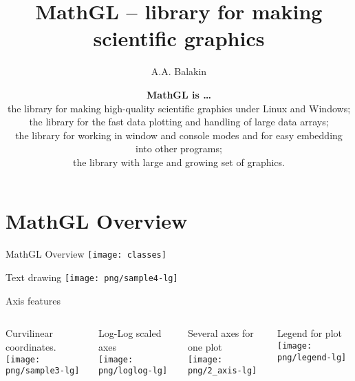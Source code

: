 \documentclass[color=usenames]{beamer}
\begin{document}
\title{MathGL -- library for making scientific graphics}

\author{A.A. Balakin}

\date{\flushleft
\textbf{MathGL is \ldots}\\
the library for making high-quality scientific graphics under Linux and Windows;\\
the library for the fast data plotting and handling of large data arrays;\\
the library for working in window and console modes and for easy embedding into other programs;\\
the library with large and growing set of graphics.
}

\begin{frame}
\titlepage
\end{frame}

\section{MathGL Overview}

\begin{frame}{MathGL Overview}
\texttt{[image: classes]}
\end{frame}

\begin{frame}{Text drawing}
\texttt{[image: png/sample4-lg]}
\end{frame}

\begin{frame}{Axis features}
\begin{columns}
Curvilinear coordinates.\\
\texttt{[image: png/sample3-lg]}

Log-Log scaled axes\\
\texttt{[image: png/loglog-lg]}

Several axes for one plot\\
\texttt{[image: png/2\_axis-lg]}

Legend for plot\\
\texttt{[image: png/legend-lg]}

\end{columns}
\end{frame}
\end{document}
